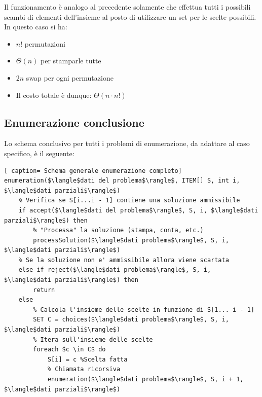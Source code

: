 \documentclass[../cheatSheetAlgoritmi.tex]{subfiles}
\begin{document}
Il funzionamento è analogo al precedente solamente che effettua tutti i possibili scambi di elementi dell'insieme al posto di utilizzare un set per le scelte possibili. \\
In questo caso si ha:
\begin{itemize}
	\item $n!$ permutazioni
	\item $\Theta(n)$ per stamparle tutte
	\item $2n$ swap per ogni permutazione
	\item Il costo totale è dunque: $\Theta(n \cdot n!)$
\end{itemize}
\subsection{Enumerazione conclusione}
Lo schema conclusivo per tutti i problemi di enumerazione, da adattare al caso specifico, è il seguente:
 \begin{lstlisting}[ caption= Schema generale enumerazione completo]
enumeration($\langle$dati del problema$\rangle$, ITEM[] S, int i, $\langle$dati parziali$\rangle$)
	% Verifica se S[i...i - 1] contiene una soluzione ammissibile
	if accept($\langle$dati del problema$\rangle$, S, i, $\langle$dati parziali$\rangle$) then
		% "Processa" la soluzione (stampa, conta, etc.)
		processSolution($\langle$dati problema$\rangle$, S, i, $\langle$dati parziali$\rangle$)
	% Se la soluzione non e' ammissibile allora viene scartata
	else if reject($\langle$dati problema$\rangle$, S, i, $\langle$dati parziali$\rangle$) then
		return
	else
		% Calcola l'insieme delle scelte in funzione di S[1... i - 1]
		SET C = choices($\langle$dati problema$\rangle$, S, i, $\langle$dati parziali$\rangle$)
		% Itera sull'insieme delle scelte
		foreach $c \in C$ do
			S[i] = c %Scelta fatta
			% Chiamata ricorsiva
			enumeration($\langle$dati problema$\rangle$, S, i + 1, $\langle$dati parziali$\rangle$)
\end{lstlisting}
\end{document}
